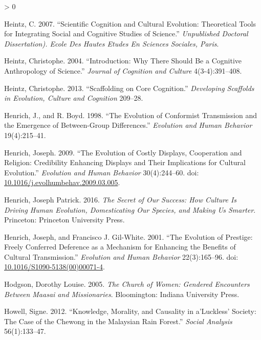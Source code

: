 \documentclass[
  11pt,
]{article}
\newlength{\cslhangindent}
\newenvironment{CSLReferences}[2] %
 {%
  \setlength{\parindent}{0pt}
  \ifodd #1 \everypar{\setlength{\hangindent}{\cslhangindent}}\ignorespaces\fi
  \ifnum #2 > 0
  \setlength{\parskip}{#2\baselineskip}
  \fi
 }%
 {}
\begin{document}
\begin{CSLReferences}{1}{0}
\leavevmode\hypertarget{ref-heintzScientificCognitionCultural2007}{}%
Heintz, C. 2007. {``Scientific Cognition and Cultural Evolution: {Theoretical} Tools for Integrating Social and Cognitive Studies of Science.''} \emph{Unpublished Doctoral Dissertation). Ecole Des Hautes Etudes En Sciences Sociales, Paris}.

\leavevmode\hypertarget{ref-heintzIntroductionWhyThere2004}{}%
Heintz, Christophe. 2004. {``Introduction: {Why} There Should Be a Cognitive Anthropology of Science.''} \emph{Journal of Cognition and Culture} 4(3-4):391--408.

\leavevmode\hypertarget{ref-heintzScaffoldingCoreCognition2013}{}%
Heintz, Christophe. 2013. {``Scaffolding on Core Cognition.''} \emph{Developing Scaffolds in Evolution, Culture and Cognition} 209--28.

\leavevmode\hypertarget{ref-henrichEvolutionConformistTransmission1998}{}%
Henrich, J., and R. Boyd. 1998. {``The {Evolution} of {Conformist Transmission} and the {Emergence} of {Between}-{Group Differences}.''} \emph{Evolution and Human Behavior} 19(4):215--41.

\leavevmode\hypertarget{ref-henrichEvolutionCostlyDisplays2009}{}%
Henrich, Joseph. 2009. {``The Evolution of Costly Displays, Cooperation and Religion: Credibility Enhancing Displays and Their Implications for Cultural Evolution.''} \emph{Evolution and Human Behavior} 30(4):244--60. doi: \href{https://doi.org/10.1016/j.evolhumbehav.2009.03.005}{10.1016/j.evolhumbehav.2009.03.005}.

\leavevmode\hypertarget{ref-henrichSecretOurSuccess2016}{}%
Henrich, Joseph Patrick. 2016. \emph{The Secret of Our Success: How Culture Is Driving Human Evolution, Domesticating Our Species, and Making Us Smarter}. {Princeton}: {Princeton University Press}.

\leavevmode\hypertarget{ref-henrichEvolutionPrestigeFreely2001}{}%
Henrich, Joseph, and Francisco J. Gil-White. 2001. {``The Evolution of Prestige: Freely Conferred Deference as a Mechanism for Enhancing the Benefits of Cultural Transmission.''} \emph{Evolution and Human Behavior} 22(3):165--96. doi: \href{https://doi.org/10.1016/S1090-5138(00)00071-4}{10.1016/S1090-5138(00)00071-4}.

\leavevmode\hypertarget{ref-hodgsonChurchWomenGendered2005}{}%
Hodgson, Dorothy Louise. 2005. \emph{The Church of Women: Gendered Encounters Between {Maasai} and Missionaries}. {Bloomington}: {Indiana University Press}.

\leavevmode\hypertarget{ref-howell2012knowledge}{}%
Howell, Signe. 2012. {``Knowledge, Morality, and Causality in a'{Luckless}' Society: {The} Case of the Chewong in the Malaysian Rain Forest.''} \emph{Social Analysis} 56(1):133--47.


\end{CSLReferences}
\end{document}
